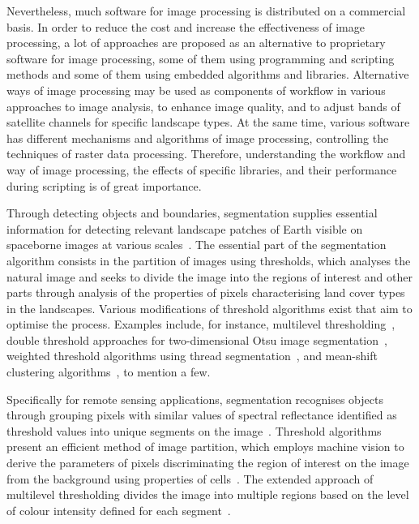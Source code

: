 \documentclass[analytics,article,accept,pdftex,moreauthors]{Definitions/mdpi}
\begin{document}
{Nevertheless, much software for image processing is distributed on a commercial basis. In order to reduce the cost and increase the effectiveness of image processing, a lot of approaches are proposed as an alternative to proprietary software for image processing, some of them using programming and scripting methods and some of them using embedded algorithms and libraries. Alternative ways of image processing may be used as components of workflow in various approaches to image analysis, to enhance image quality, and to adjust bands of satellite channels for specific landscape types. At the same time, various software has different mechanisms and algorithms of image processing, controlling the techniques of raster data processing. Therefore, understanding the workflow and way of image processing, the effects of specific libraries, and their performance during scripting is of great importance.}

Through detecting objects and boundaries, segmentation supplies essential information for detecting relevant landscape patches of Earth visible on spaceborne images at various scales~\cite{Tzotsos}. The essential part of the segmentation algorithm consists in the partition of images using thresholds, which analyses the natural image and seeks to divide the image into the regions of interest and other parts through analysis of the properties of pixels characterising land cover types in the landscapes. Various modifications of threshold algorithms exist that aim to optimise the process. Examples include, for instance, multilevel thresholding~\cite{9983775,8304271,8633236}, double threshold approaches for two-dimensional Otsu image segmentation~\cite{9421654,6066573}, weighted threshold algorithms using thread segmentation~\cite{7493998}, and mean-shift clustering algorithms~\cite{BARBATO2022100823}, to mention a few. 

Specifically for remote sensing applications, segmentation recognises objects through grouping pixels with similar values of spectral reflectance identified as threshold values into unique segments on the image~\cite{PAL20229964}. Threshold algorithms present an efficient method of image partition, which employs  machine vision to derive the parameters of pixels discriminating the region of interest on the image from the background using properties of cells~\cite{6100288}. The extended approach of multilevel thresholding divides the image into multiple regions based on the level of colour intensity defined for each segment~\cite{9244772,5721309,6755644}.
\end{document}
